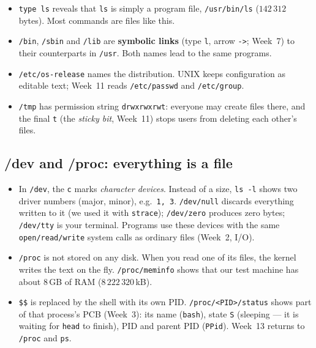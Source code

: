\documentclass[11pt,a4paper]{article}
\newcommand{\term}[1]{\textbf{\color{mintdeep}#1}}
\newcommand{\cmd}[1]{\texttt{#1}}
\begin{document}
\begin{itemize}
  \item \cmd{type ls} reveals that \cmd{ls} is simply a program file, \texttt{/usr/bin/ls} ($142\,312$ bytes). Most commands are files like this.
  \item \texttt{/bin}, \texttt{/sbin} and \texttt{/lib} are \term{symbolic links} (type \texttt{l}, arrow \texttt{->}; Week~7) to their counterparts in \texttt{/usr}. Both names lead to the same programs.
  \item \texttt{/etc/os-release} names the distribution. UNIX keeps configuration as editable text; Week~11 reads \texttt{/etc/passwd} and \texttt{/etc/group}.
  \item \texttt{/tmp} has permission string \texttt{drwxrwxrwt}: everyone may create files there, and the final \texttt{t} (the \emph{sticky bit}, Week~11) stops users from deleting each other's files.
\end{itemize}

\subsection{/dev and /proc: everything is a file}


\begin{itemize}
  \item In \texttt{/dev}, the \texttt{c} marks \emph{character devices}. Instead of a size, \cmd{ls -l} shows two driver numbers (major, minor), e.g.\ \texttt{1, 3}. \texttt{/dev/null} discards everything written to it (we used it with \cmd{strace}); \texttt{/dev/zero} produces zero bytes; \texttt{/dev/tty} is your terminal. Programs use these devices with the same \texttt{open/read/write} system calls as ordinary files (Week~2, I/O).
  \item \texttt{/proc} is not stored on any disk. When you read one of its files, the kernel writes the text on the fly. \texttt{/proc/meminfo} shows that our test machine has about $8$\,GB of RAM ($8\,222\,320$\,kB).
  \item \texttt{\$\$} is replaced by the shell with its own PID. \texttt{/proc/<PID>/status} shows part of that process's PCB (Week~3): its name (\texttt{bash}), state \texttt{S} (sleeping --- it is waiting for \cmd{head} to finish), PID and parent PID (\texttt{PPid}). Week~13 returns to \texttt{/proc} and \cmd{ps}.
\end{itemize}

\end{document}
